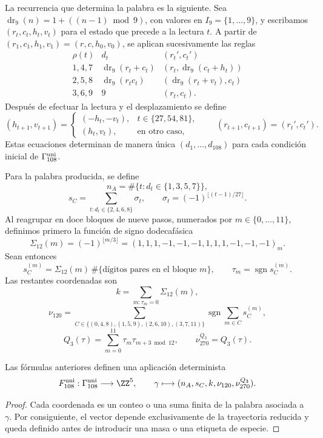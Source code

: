 La recurrencia que determina la palabra es la siguiente. Sea
\(\operatorname{dr}_9(n)=1+((n-1)\bmod 9)\), con valores en
\(I_9=\{1,\ldots,9\}\), y escribamos
\((r_t,c_t,h_t,v_t)\) para el estado que precede a la lectura \(t\). A partir
de \((r_1,c_1,h_1,v_1)=(r,c,h_0,v_0)\), se aplican sucesivamente las reglas
\[
\begin{array}{c|c|c}
 \rho(t)&d_t&(r_t',c_t')\\ \hline
 1,4,7&\operatorname{dr}_9(r_t+c_t)&
       (r_t,\operatorname{dr}_9(c_t+h_t))\\
 2,5,8&\operatorname{dr}_9(r_tc_t)&
       (\operatorname{dr}_9(r_t+v_t),c_t)\\
 3,6,9&9&(r_t,c_t).
\end{array}
\]
Después de efectuar la lectura y el desplazamiento se define
\[
 (h_{t+1},v_{t+1})=
 \begin{cases}
   (-h_t,-v_t),&t\in\{27,54,81\},\\
   (h_t,v_t),&\text{en otro caso},
 \end{cases}
 \qquad
 (r_{t+1},c_{t+1})=(r_t',c_t').
\]
Estas ecuaciones determinan de manera única
\((d_1,\ldots,d_{108})\) para cada condición inicial de
\(\Gamma_{108}^{\rm uni}\).

Para la palabra producida, se define
\[
 n_A=\#\{t:d_t\in\{1,3,5,7\}\},
\]
\[
 s_C=\sum_{t:d_t\in\{2,4,6,8\}}\sigma_t,
 \qquad
 \sigma_t=(-1)^{\lfloor(t-1)/27\rfloor}.
\]
Al reagrupar en doce bloques de nueve pasos, numerados por
\(m\in\{0,\ldots,11\}\), definimos primero la función de signo dodecafásica
\[
 \Sigma_{12}(m)=(-1)^{\lfloor m/3\rfloor}
 =(1,1,1,-1,-1,-1,1,1,1,-1,-1,-1)_m.
\]
Sean entonces
\[
 s_C^{(m)}=\Sigma_{12}(m)\,
 \#\{\text{dígitos pares en el bloque }m\},
 \qquad
 \tau_m=\operatorname{sgn}s_C^{(m)}.
\]
Las restantes coordenadas son
\[
 k=\sum_{m:\tau_m=0}\Sigma_{12}(m),
\]
\[
 \nu_{120}=\sum_{C\in\{(0,4,8),(1,5,9),(2,6,10),(3,7,11)\}}
 \operatorname{sgn}\sum_{m\in C}s_C^{(m)},
\]
\[
 Q_3(\tau)=\sum_{m=0}^{11}\tau_m\tau_{m+3\bmod12},
 \qquad \nu_{270}^{Q_3}=Q_3(\tau).
\]

\begin{proposition}
Las fórmulas anteriores definen una aplicación determinista
\[
 F_{108}^{\rm uni}:\Gamma_{108}^{\rm uni}\longrightarrow\ZZ^5,
 \qquad
 \gamma\longmapsto(n_A,s_C,k,\nu_{120},\nu_{270}^{Q_3}).
\]
\end{proposition}
\begin{proof}
Cada coordenada es un conteo o una suma finita de la palabra asociada a
\(\gamma\). Por consiguiente, el vector depende exclusivamente de la
trayectoria reducida y queda definido antes de introducir una masa o una
etiqueta de especie.
\end{proof}

